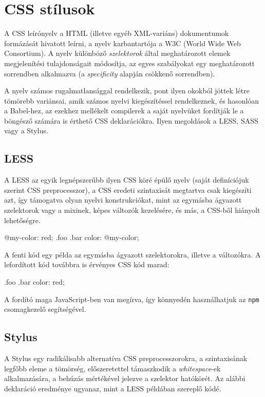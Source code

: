 \section{CSS stílusok}

A CSS\cite{css} leírónyelv a HTML (illetve egyéb XML-variáns) dokumentumok
formázását hivatott leírni, a nyelv karbantartója a W3C (World Wide Web
Consortium). A nyelv különböző \emph{szelektorok} által meghatározott elemek
megjelenítési tulajdonságait módosítja, az egyes szabályokat egy meghatározott
sorrendben alkalmazva (a \emph{specificity}\cite{cssspec} alapján csökkenő
sorrendben).

A nyelv számos rugalmatlansággal rendelkezik, pont ilyen okokból jöttek létre
tömörebb variánsai, amik számos nyelvi kiegészítéssel rendelkeznek, és hasonlóan
a Babel-hez, az ezekhez mellékelt compilerek a saját nyelvüket fordítják le a
böngésző számára is érthető CSS deklarációkra.  Ilyen megoldások a
LESS\cite{less}, SASS\cite{sass} vagy a Stylus\cite{stylus}.

\subsection{LESS}

A LESS az egyik legnépszerűbb ilyen CSS köré épülő nyelv (saját definíciójuk
szerint CSS preprocesszor), a CSS eredeti szintaxisát megtartva csak kiegészíti
azt, így támogatva olyan nyelvi konstrukciókat, mint az egymásba ágyazott
szelektorok vagy a mixinek, képes változók kezelésére, és más, a CSS-ből
hiányolt lehetőségre.

\begin{css}
@my-color: red;
.foo {
  .bar {
    color: @my-color;
  }
}
\end{css}

A fenti kód egy példa az egymásba ágyazott szelektorokra, illetve a változókra.
A lefordított kód továbbra is érvényes CSS kód marad:

\begin{css}
.foo .bar {
  color: red;
}
\end{css}

A fordító maga JavaScript-ben van megírva, így könnyedén használhatjuk az
\texttt{npm} csomagkezelő segítségével.

\subsection{Stylus}

A Stylus egy radikálisabb alternatíva CSS preprocesszorokra, a szintaxisának
legfőbb eleme a tömörség, előszeretettel támaszkodik a \emph{whitespace}-ek
alkalmazására, a behúzás mértékével jelezve a szelektor hatókörét.  Az alábbi
deklaráció eredménye ugyanaz, mint a LESS példában szereplő kódé.

